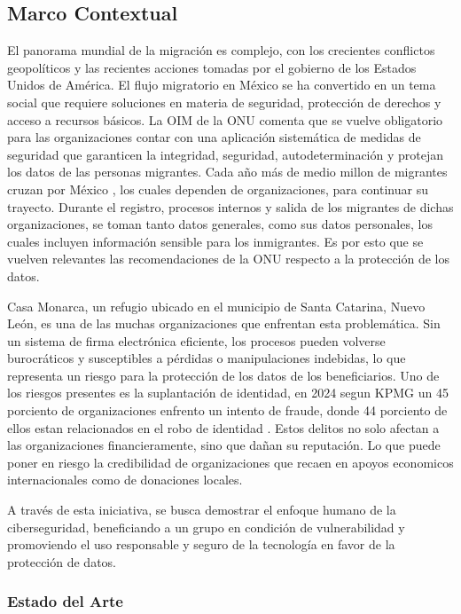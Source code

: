 \documentclass{amsart}
\begin{document}
    \subsection{Marco Contextual}
    El panorama mundial de la migración es complejo, con los crecientes conflictos geopolíticos y las recientes acciones tomadas por el gobierno de los Estados Unidos de América. El flujo migratorio en México se ha convertido en un tema social que requiere soluciones en materia de seguridad, protección de derechos y acceso a recursos básicos. La OIM de la ONU \parencite{OIM-Mexico} comenta que se vuelve obligatorio para las organizaciones contar con una aplicación sistemática de medidas de seguridad que garanticen la integridad, seguridad, autodeterminación y protejan los datos de las personas migrantes. 
    Cada año más de medio millon de migrantes cruzan por México \parencite{oim-mexico-2023}, los cuales dependen de organizaciones, para continuar su trayecto. Durante el registro, procesos internos y salida de los migrantes de dichas organizaciones, se toman tanto datos generales, como sus datos personales, los cuales incluyen información sensible para los inmigrantes. Es por esto que se vuelven relevantes las recomendaciones de la ONU respecto a la protección de los datos. 

    Casa Monarca, un refugio ubicado en el municipio de Santa Catarina, Nuevo León, es una de las muchas organizaciones que enfrentan esta problemática. Sin un sistema de firma electrónica eficiente, los procesos pueden volverse burocráticos y susceptibles a pérdidas o manipulaciones indebidas, lo que representa un riesgo para la protección de los datos de los beneficiarios. Uno de los riesgos presentes es la suplantación de identidad, en 2024 segun KPMG un 45 porciento de organizaciones enfrento un intento de fraude, donde 44 porciento de ellos estan relacionados en el robo de identidad \parencite{orozco-2024}. 
    Estos delitos no solo afectan a las organizaciones financieramente, sino que dañan su reputación. Lo que puede poner en riesgo la credibilidad de organizaciones que recaen en apoyos economicos internacionales como de donaciones locales. 

    A través de esta iniciativa, se busca demostrar el enfoque humano de la ciberseguridad, beneficiando a un grupo en condición de vulnerabilidad y promoviendo el uso responsable y seguro de la tecnología en favor de la protección de datos.
        
    \subsubsection{Estado del Arte}
    
\end{document}

